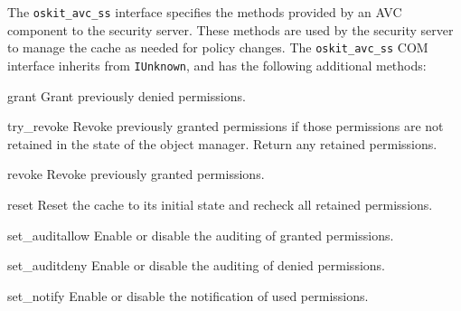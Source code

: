 	The {\tt oskit_avc_ss} interface specifies the methods
provided by an AVC component to the security server.  These
methods are used by the security server to manage the cache as
needed for policy changes.  The {\tt oskit_avc_ss} COM interface 
inherits from {\tt IUnknown}, and has the following additional methods:	
\begin{csymlist}
\item[grant]
	Grant previously denied permissions.
\item[try\_revoke]
	Revoke previously granted permissions if those permissions are
	not retained in the state of the object manager.  Return any
	retained permissions.
\item[revoke]
	Revoke previously granted permissions.
\item[reset]
	Reset the cache to its initial state and recheck all retained
	permissions.
\item[set\_auditallow]
	Enable or disable the auditing of granted permissions.
\item[set\_auditdeny]
	Enable or disable the auditing of denied permissions.
\item[set\_notify]
	Enable or disable the notification of used permissions.
\end{csymlist}

